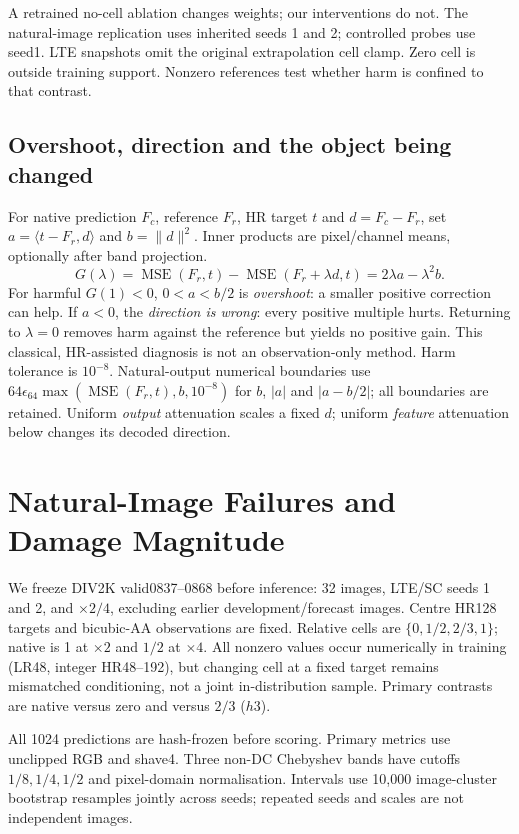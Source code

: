 A retrained no-cell ablation changes weights; our interventions do not.
The natural-image replication uses inherited seeds 1 and 2; controlled
probes use seed1. LTE snapshots omit the original extrapolation cell clamp.
Zero cell is outside training support. Nonzero references test whether
harm is confined to that contrast.

\subsection{Overshoot, direction and the object being changed}
For native prediction $F_c$, reference $F_r$, HR target $t$ and
$d=F_c-F_r$, set $a=\langle t-F_r,d\rangle$ and $b=\|d\|^2$.
Inner products are pixel/channel means, optionally after band projection.
\begin{equation}
 G(\lambda)=\operatorname{MSE}(F_r,t)-\operatorname{MSE}(F_r+\lambda d,t)
            =2\lambda a-\lambda^2b.
 \label{eq:gain}
\end{equation}
For harmful $G(1)<0$, $0<a<b/2$ is \emph{overshoot}: a smaller positive
correction can help. If $a<0$, the \emph{direction is wrong}: every
positive multiple hurts. Returning to $\lambda=0$ removes harm against
the reference but yields no positive gain. This classical, HR-assisted
diagnosis is not an observation-only method. Harm tolerance is $10^{-8}$.
Natural-output numerical boundaries use
$64\epsilon_{64}\max(\operatorname{MSE}(F_r,t),b,10^{-8})$ for $b$,
$|a|$ and $|a-b/2|$; all boundaries are retained.
Uniform \emph{output} attenuation scales a fixed $d$; uniform
\emph{feature} attenuation below changes its decoded direction.

\section{Natural-Image Failures and Damage Magnitude}
\label{sec:failure}
We freeze DIV2K valid0837--0868 before inference: 32 images, LTE/SC
seeds 1 and 2, and $\times2/4$, excluding earlier development/forecast
images. Centre HR128 targets and bicubic-AA observations are fixed.
Relative cells are $\{0,1/2,2/3,1\}$; native is 1 at $\times2$ and
$1/2$ at $\times4$. All nonzero values occur numerically in training
(LR48, integer HR48--192), but changing cell at a fixed target remains
mismatched conditioning, not a joint in-distribution sample.
Primary contrasts are native versus zero and versus $2/3$ ($h3$).

All 1024 predictions are hash-frozen before scoring. Primary metrics use
unclipped RGB and shave4. Three non-DC Chebyshev bands have cutoffs
$1/8,1/4,1/2$ and pixel-domain normalisation. Intervals use 10,000
image-cluster bootstrap resamples jointly across seeds; repeated seeds
and scales are not independent images.

